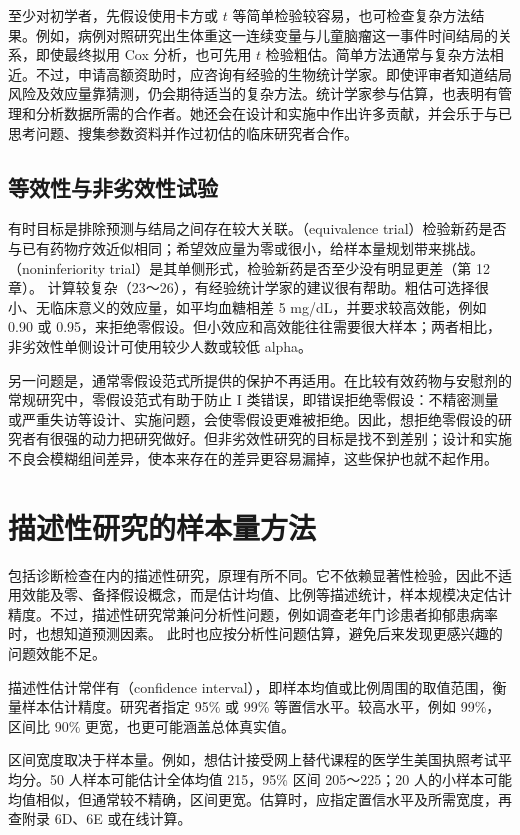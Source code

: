 至少对初学者，先假设使用卡方或 $t$ 等简单检验较容易，也可检查复杂方法结果。例如，病例对照研究出生体重这一连续变量与儿童脑瘤这一事件时间结局的关系，即使最终拟用 Cox 分析，也可先用 $t$ 检验粗估。简单方法通常与复杂方法相近。不过，申请高额资助时，应咨询有经验的生物统计学家。即使评审者知道结局风险及效应量靠猜测，仍会期待适当的复杂方法。统计学家参与估算，也表明有管理和分析数据所需的合作者。她还会在设计和实施中作出许多贡献，并会乐于与已思考问题、搜集参数资料并作过初估的临床研究者合作。

\subsection{等效性与非劣效性试验}
有时目标是排除预测与结局之间存在较大关联。（equivalence trial）检验新药是否与已有药物疗效近似相同；希望效应量为零或很小，给样本量规划带来挑战。（noninferiority trial）是其单侧形式，检验新药是否至少没有明显更差（第 12 章）。
计算较复杂（23～26），有经验统计学家的建议很有帮助。粗估可选择很小、无临床意义的效应量，如平均血糖相差 5 mg/dL，并要求较高效能，例如 0.90 或 0.95，来拒绝零假设。但小效应和高效能往往需要很大样本；两者相比，非劣效性单侧设计可使用较少人数或较低 alpha。

另一问题是，通常零假设范式所提供的保护不再适用。在比较有效药物与安慰剂的常规研究中，零假设范式有助于防止 I 类错误，即错误拒绝零假设：不精密测量或严重失访等设计、实施问题，会使零假设更难被拒绝。因此，想拒绝零假设的研究者有很强的动力把研究做好。但非劣效性研究的目标是找不到差别；设计和实施不良会模糊组间差异，使本来存在的差异更容易漏掉，这些保护也就不起作用。

\section{描述性研究的样本量方法}
包括诊断检查在内的描述性研究，原理有所不同。它不依赖显著性检验，因此不适用效能及零、备择假设概念，而是估计均值、比例等描述统计，样本规模决定估计精度。不过，描述性研究常兼问分析性问题，例如调查老年门诊患者抑郁患病率时，也想知道预测因素。
此时也应按分析性问题估算，避免后来发现更感兴趣的问题效能不足。

描述性估计常伴有（confidence interval），即样本均值或比例周围的取值范围，衡量样本估计精度。研究者指定 95\% 或 99\% 等置信水平。较高水平，例如 99\%，区间比 90\% 更宽，也更可能涵盖总体真实值。

区间宽度取决于样本量。例如，想估计接受网上替代课程的医学生美国执照考试平均分。50 人样本可能估计全体均值 215，95\% 区间 205～225；20 人的小样本可能均值相似，但通常较不精确，区间更宽。估算时，应指定置信水平及所需宽度，再查附录 6D、6E 或在线计算。

